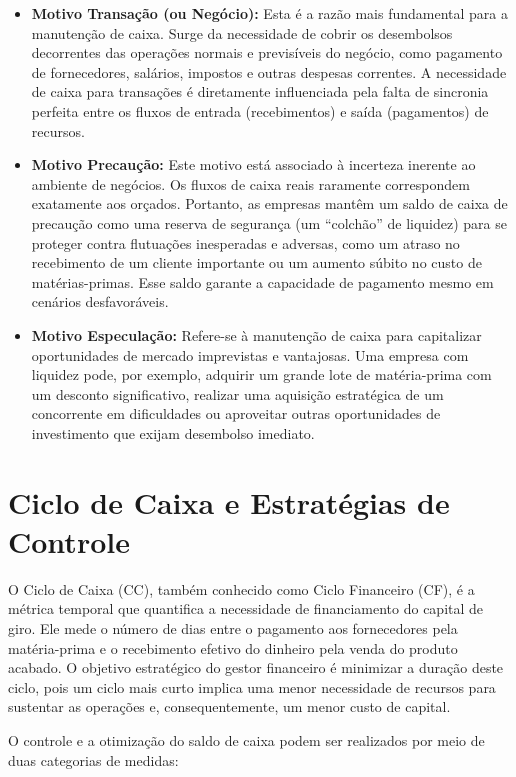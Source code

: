 \documentclass[
  a4paper,
]{book}
\begin{document}
\begin{itemize}
\item
  \textbf{Motivo Transação (ou Negócio):} Esta é a razão mais
  fundamental para a manutenção de caixa. Surge da necessidade de cobrir
  os desembolsos decorrentes das operações normais e previsíveis do
  negócio, como pagamento de fornecedores, salários, impostos e outras
  despesas correntes. A necessidade de caixa para transações é
  diretamente influenciada pela falta de sincronia perfeita entre os
  fluxos de entrada (recebimentos) e saída (pagamentos) de recursos.
\item
  \textbf{Motivo Precaução:} Este motivo está associado à incerteza
  inerente ao ambiente de negócios. Os fluxos de caixa reais raramente
  correspondem exatamente aos orçados. Portanto, as empresas mantêm um
  saldo de caixa de precaução como uma reserva de segurança (um
  ``colchão'' de liquidez) para se proteger contra flutuações
  inesperadas e adversas, como um atraso no recebimento de um cliente
  importante ou um aumento súbito no custo de matérias-primas. Esse
  saldo garante a capacidade de pagamento mesmo em cenários
  desfavoráveis.
\item
  \textbf{Motivo Especulação:} Refere-se à manutenção de caixa para
  capitalizar oportunidades de mercado imprevistas e vantajosas. Uma
  empresa com liquidez pode, por exemplo, adquirir um grande lote de
  matéria-prima com um desconto significativo, realizar uma aquisição
  estratégica de um concorrente em dificuldades ou aproveitar outras
  oportunidades de investimento que exijam desembolso imediato.
\end{itemize}

\section{Ciclo de Caixa e Estratégias de
Controle}\label{ciclo-de-caixa-e-estratuxe9gias-de-controle}

O Ciclo de Caixa (CC), também conhecido como Ciclo Financeiro (CF), é a
métrica temporal que quantifica a necessidade de financiamento do
capital de giro. Ele mede o número de dias entre o pagamento aos
fornecedores pela matéria-prima e o recebimento efetivo do dinheiro pela
venda do produto acabado. O objetivo estratégico do gestor financeiro é
minimizar a duração deste ciclo, pois um ciclo mais curto implica uma
menor necessidade de recursos para sustentar as operações e,
consequentemente, um menor custo de capital.

O controle e a otimização do saldo de caixa podem ser realizados por
meio de duas categorias de medidas:
\end{document}
